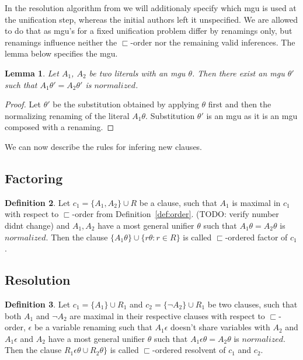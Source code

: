 \documentclass[english, shortabstract]{iithesis}
\theoremstyle{definition} \newtheorem{definition}{Definition}[chapter]
\theoremstyle{remark} \newtheorem{remark}[definition]{Observation}
\theoremstyle{plain} \newtheorem{theorem}[definition]{Theorem}
\theoremstyle{plain} \newtheorem{lemma}[definition]{Lemma}
\begin{document}
In the resolution algorithm from \cite{resolution gf} we will additionaly specify which mgu is used at the unification step,
whereas the initial authors left it unspecified.
We are allowed to do that as mgu's for a fixed unification problem differ by renamings only,
but renamings influence neither the $\sqsubset$-order nor the remaining valid inferences.
The lemma below specifies the mgu.
\begin{lemma}
Let $A_1$, $A_2$ be two literals with an mgu $\theta$.
Then there exist an mgu $\theta'$ such that $A_1\theta'=A_2\theta'$ is $normalized$.
\end{lemma}
\begin{proof}
Let $\theta'$ be the substitution obtained by applying $\theta$ first and then the normalizing renaming of the literal $A_1\theta$.
Substitution $\theta'$ is an mgu as it is an mgu composed with a renaming.
\end{proof}

We can now describe the rules for infering new clauses.

\subsection{Factoring}

\begin{definition}\label{def:factoring}
Let $c_1=\{A_1, A_2\} \cup R$ be a clause,
such that $A_1$ is maximal in $c_1$ with respect to $\sqsubset$-order from Definition~\ref{def:order}. (TODO: verify number didnt change)
and $A_1, A_2$ have a most general unifier $\theta$ such that $A_1\theta=A_2\theta$ is $normalized$.
Then the clause $\{A_1\theta\}\cup \{r\theta : r \in R\}$ is called $\sqsubset$-ordered factor of $c_1$.
\end{definition}

\subsection{Resolution}

\begin{definition}\label{def:resolution}
Let $c_1=\{A_1\} \cup R_1$ and $c_2=\{\lnot A_2\} \cup R_1$ be two clauses,
such that both $A_1$ and $\lnot A_2$ are maximal in their respective clauses with respect to $\sqsubset$-order,
$\epsilon$ be a variable renaming such that $A_1\epsilon$ doesn't share variables with $A_2$
and $A_1\epsilon$ and $A_2$ have a most general unifier $\theta$ such that $A_1\epsilon\theta=A_2\theta$ is $normalized$.
Then the clause $R_1\epsilon\theta \cup R_2\theta\}$ is called $\sqsubset$-ordered resolvent of $c_1$ and $c_2$.
\end{definition}
\end{document}
